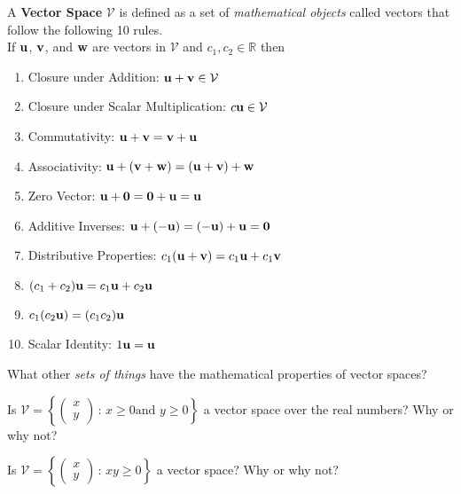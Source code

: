 \begin{definition}\label{defn:vs}
    A {\bf Vector Space} $\mathcal{V}$ is defined as a set of {\it mathematical objects}
    called vectors that follow the following 10 rules.\\
    If ${\bf u}$, ${\bf v}$, and ${\bf w}$ are vectors in $\mathcal{V}$ and $c_1,c_2 \in \mathbb{R}$ then
    \begin{enumerate}
        \item Closure under Addition: ${\bf u} + {\bf v} \in \mathcal{V}$
        \item Closure under Scalar Multiplication: $c{\bf u} \in \mathcal{V}$
        \item Commutativity: ${\bf u} + {\bf v} = {\bf v} + {\bf u}$
        \item Associativity: ${\bf u} + ({\bf v} + {\bf w}) = ({\bf u} + {\bf v}) + {\bf w}$
        \item Zero Vector: ${\bf u} + {\bf 0} = {\bf 0} + {\bf u} = {\bf u}$
        \item Additive Inverses: ${\bf u} + (-{\bf u}) = (-{\bf u}) + {\bf u} = {\bf 0}$
        \item Distributive Properties: $c_1 ({\bf u} + {\bf v}) = c_1 {\bf u} + c_1 {\bf v}$
        \item $(c_1 + c_2) {\bf u} = c_1 {\bf u} + c_2 {\bf u}$
        \item $c_1 (c_2 {\bf u}) = (c_1 c_2) {\bf u}$
        \item Scalar Identity: $1 {\bf u} = {\bf u}$
    \end{enumerate}
\end{definition}



\begin{problem}
        What other {\it sets of things} have the mathematical properties of vector
        spaces?
\end{problem}


\begin{problem}
    Is $\mathcal{V} = \left\{ \begin{pmatrix} x \\ y \end{pmatrix} \, : \, x \ge 0 \text{
    and } y \ge 0 \right\}$ a vector space over the real numbers?  Why or why not?
\end{problem}

\begin{problem}
    Is $\mathcal{V} = \left\{ \begin{pmatrix} x \\ y \end{pmatrix} \, : \, x y\ge 0 \right\}$ a vector space?  Why or why not?
\end{problem}




